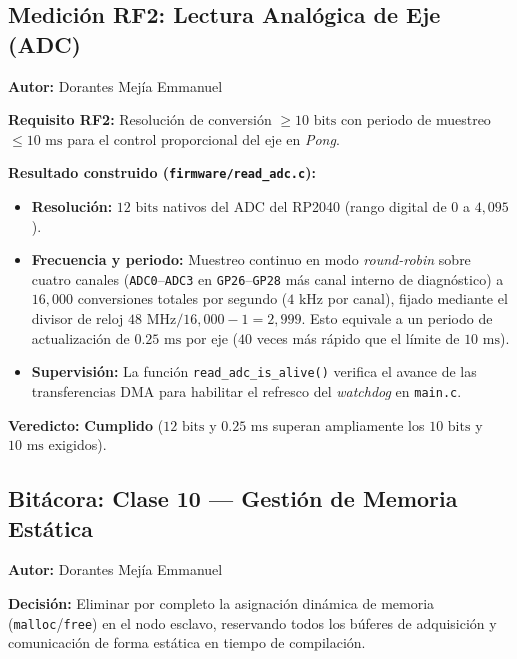 
\subsection{Medición RF2: Lectura Analógica de Eje (ADC)}
\textbf{Autor:} Dorantes Mejía Emmanuel

\textbf{Requisito RF2:} Resolución de conversión $\ge 10\text{ bits}$ con periodo de muestreo $\le 10\text{ ms}$ para el control proporcional del eje en \textit{Pong}.

\textbf{Resultado construido (\texttt{firmware/read\_adc.c}):}
\begin{itemize}
	\item \textbf{Resolución:} $12\text{ bits}$ nativos del ADC del RP2040 (rango digital de $0$ a $4{,}095$).
	\item \textbf{Frecuencia y periodo:} Muestreo continuo en modo \textit{round-robin} sobre cuatro canales (\texttt{ADC0}--\texttt{ADC3} en \texttt{GP26}--\texttt{GP28} más canal interno de diagnóstico) a $16{,}000$ conversiones totales por segundo ($4\text{ kHz}$ por canal), fijado mediante el divisor de reloj $48\text{ MHz} / 16{,}000 - 1 = 2{,}999$. Esto equivale a un periodo de actualización de \textbf{$0.25\text{ ms}$} por eje ($40$ veces más rápido que el límite de $10\text{ ms}$).
	\item \textbf{Supervisión:} La función \texttt{read\_adc\_is\_alive()} verifica el avance de las transferencias DMA para habilitar el refresco del \textit{watchdog} en \texttt{main.c}.
\end{itemize}

\textbf{Veredicto:} \textbf{Cumplido} ($12\text{ bits}$ y $0.25\text{ ms}$ superan ampliamente los $10\text{ bits}$ y $10\text{ ms}$ exigidos).

\subsection{Bitácora: Clase 10 — Gestión de Memoria Estática}
\textbf{Autor:} Dorantes Mejía Emmanuel

\textbf{Decisión:} Eliminar por completo la asignación dinámica de memoria (\texttt{malloc}/\texttt{free}) en el nodo esclavo, reservando todos los búferes de adquisición y comunicación de forma estática en tiempo de compilación.

